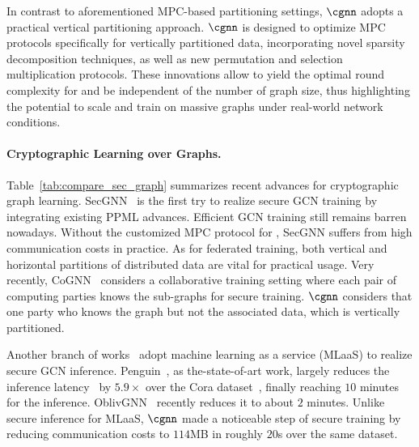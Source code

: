 In contrast to aforementioned MPC-based partitioning settings, $\cgnn$ adopts a practical vertical partitioning approach.
$\cgnn$ is designed to optimize MPC protocols specifically for vertically partitioned data, incorporating novel sparsity decomposition techniques, as well as new permutation and selection multiplication protocols. 
These innovations allow \cgnn to yield the optimal round complexity  for \osmm and be independent of the number of graph size, thus highlighting the potential  to scale and train on massive graphs under real-world network conditions.

 

\paragraph{Cryptographic Learning over Graphs.}
Table~\ref{tab:compare_sec_graph} summarizes recent advances for cryptographic graph learning. 
SecGNN~\cite{tsc/WangZJ23} is the first try to realize secure GCN training %
by integrating existing PPML advances.
Efficient GCN training still remains barren nowadays.
Without the customized MPC protocol for \osmm, %
SecGNN suffers from high communication costs in practice.
As for federated training, both vertical and horizontal partitions of distributed data are vital for practical usage.
Very recently, CoGNN~\cite{ccs/ZouLSLXX24} considers a collaborative training setting where each pair of computing parties knows the sub-graphs for secure training.
$\cgnn$ considers that one party who knows the graph but not the associated data, which is vertically partitioned.

Another branch of works~\cite{nips/PengRLZHTGWXWD23,nips/RanXLWQW23,nips/RanWGYXW22,uss/XuL0AYY24} adopt machine learning as a service (MLaaS) to realize secure GCN inference.
Penguin~\cite[Table 3]{nips/RanXLWQW23}, as the-state-of-art work, largely reduces the inference latency~\cite{uss/JuvekarVC18} by $5.9\times$ over the Cora dataset~\cite{aim/SenNBGGE08}, finally reaching $10$ minutes for the inference.
OblivGNN~\cite{uss/XuL0AYY24} recently reduces it to about $2$ minutes.
Unlike secure inference for MLaaS, $\cgnn$ made a noticeable step of secure training by reducing communication costs to $114$MB in roughly $20$s over the same dataset.


